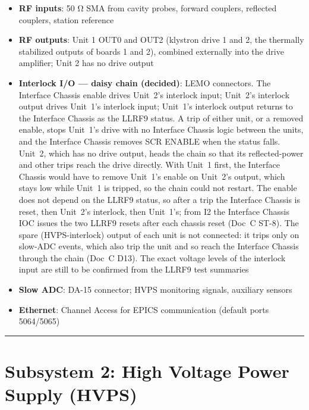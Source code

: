 {\begin{itemize}
\tightlist
\item
  \textbf{RF inputs}: 50 Ω SMA from cavity probes, forward couplers, reflected couplers, station reference
\item
  \textbf{RF outputs}: Unit 1 OUT0 and OUT2 (klystron drive 1 and 2, the thermally stabilized outputs of boards 1 and 2), combined externally into the drive amplifier; Unit 2 has no drive output
\item
  \textbf{Interlock I/O --- daisy chain (decided)}: LEMO connectors. The Interface Chassis enable drives Unit~2's interlock input; Unit~2's interlock output drives Unit~1's interlock input; Unit~1's interlock output returns to the Interface Chassis as the LLRF9 status. A trip of either unit, or a removed enable, stops Unit~1's drive with no Interface Chassis logic between the units, and the Interface Chassis removes SCR ENABLE when the status falls. Unit~2, which has no drive output, heads the chain so that its reflected-power and other trips reach the drive directly. With Unit~1 first, the Interface Chassis would have to remove Unit~1's enable on Unit~2's output, which stays low while Unit~1 is tripped, so the chain could not restart. The enable does not depend on the LLRF9 status, so after a trip the Interface Chassis is reset, then Unit~2's interlock, then Unit~1's; from I2 the Interface Chassis IOC issues the two LLRF9 resets after each chassis reset (Doc~C ST-8). The spare (HVPS-interlock) output of each unit is not connected: it trips only on slow-ADC events, which also trip the unit and so reach the Interface Chassis through the chain (Doc~C D13). The exact voltage levels of the interlock input are still to be confirmed from the LLRF9 test summaries
\item
  \textbf{Slow ADC}: DA-15 connector; HVPS monitoring signals, auxiliary sensors
\item
  \textbf{Ethernet}: Channel Access for EPICS communication (default ports 5064/5065)
\end{itemize}

\begin{center}\rule{0.5\linewidth}{0.5pt}\end{center}

\section{Subsystem 2: High Voltage Power Supply (HVPS)}\label{subsystem-2-high-voltage-power-supply-hvps}

}
